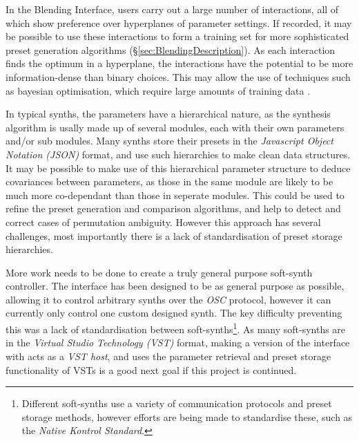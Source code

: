 \documentclass[11pt, oneside]{report}   	%
\begin{document}
{In the Blending Interface, users carry out a large number of interactions, all of which show preference over hyperplanes of parameter settings. If recorded, it may be possible to use these interactions to form a training set for more sophisticated preset generation algorithms (\S \ref{sec:BlendingDescription}). As each interaction finds the optimum in a hyperplane, the interactions have the potential to be more information-dense than binary choices. This may allow the use of techniques such as bayesian optimisation, which require large amounts of training data \cite{PreferenceGallery}. 
%

In typical synths, the parameters have a hierarchical nature, as the synthesis algorithm is usally made up of several modules, each with their own parameters and/or sub modules. Many synths store their presets in the \emph{Javascript Object Notation (JSON)} format, and use such hierarchies to make clean data structures. It may be possible to make use of this hierarchical parameter structure to deduce covariances between parameters, as those in the same module are likely to be much more co-dependant than those in seperate modules. This could be used to refine the preset generation and comparison algorithms, and help to detect and correct cases of permutation ambiguity. However this approach has several challenges, most importantly there is a lack of standardisation of preset storage hierarchies.

More work needs to be done to create a truly general purpose soft-synth controller. The interface has been designed to be as general purpose as possible, allowing it to control arbitrary synths over the \emph{OSC} protocol, however it can currently only control one custom designed synth. The key difficulty preventing this was a lack of standardisation between soft-synths\footnote{Different soft-synths use a variety of communication protocols and preset storage methods, however efforts are being made to standardise these, such as the \emph{Native Kontrol Standard}.}. As many soft-synths are in the \emph{Virtual Studio Technology (VST)} format, making a version of the interface with acts as a \emph{VST host}, and uses the parameter retrieval and preset storage functionality of VSTs is a good next goal if this project is continued.

}
\end{document}
